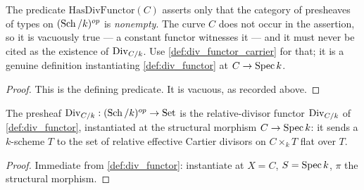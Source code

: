 \begin{definition}
  \label{def:has_div_functor}
  The predicate \(\mathrm{HasDivFunctor}(C)\) asserts only that the category of
  presheaves of types on \((\operatorname{Sch}/k)^{op}\) is \emph{nonempty}. The curve \(C\)
  does not occur in the assertion, so it is vacuously true --- a constant functor
  witnesses it --- and it must never be cited as the existence of
  \(\operatorname{Div}_{C/k}\). Use \cref{def:div_functor_carrier} for that; it is a genuine
  definition instantiating \cref{def:div_functor} at \(C \to \operatorname{Spec} k\).
\end{definition}

\begin{proof}
  This is the defining predicate. It is vacuous, as recorded above.
\end{proof}

\begin{definition}\leanok
  \label{def:div_functor_carrier}
  The presheaf \(\mathrm{Div}_{C/k} : (\operatorname{Sch}/k)^{op} \to \mathrm{Set}\) is the
  relative-divisor functor \(\operatorname{Div}_{C/k}\) of \cref{def:div_functor},
  instantiated at the structural morphism \(C \to \operatorname{Spec} k\): it sends a
  \(k\)-scheme \(T\) to the set of relative effective Cartier divisors on
  \(C \times_k T\) flat over \(T\).
\end{definition}

\begin{proof}\leanok
  Immediate from \cref{def:div_functor}: instantiate at
  \(X = C\), \(S = \operatorname{Spec} k\), \(\pi\) the structural morphism.
\end{proof}

